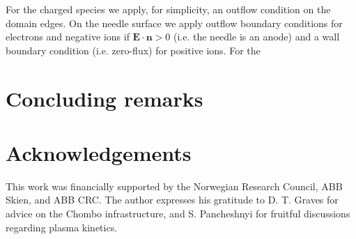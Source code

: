 \documentclass[3p]{elsarticle}
\begin{document}
For the charged species we apply, for simplicity, an outflow condition on the domain edges. On the needle surface we apply outflow boundary conditions for electrons and negative ions if $\bm{E}\cdot\bm{n} > 0$ (i.e. the needle is an anode) and a wall boundary condition (i.e. zero-flux) for positive ions. For the 


\section{Concluding remarks}
\label{sec:remarks}



\section*{Acknowledgements}
This work was financially supported by the Norwegian Research Council, ABB Skien, and ABB CRC. The author expresses his gratitude to D. T. Graves for advice on the Chombo infrastructure, and S. Pancheshnyi for fruitful discussions regarding plasma kinetics. 
\end{document}
